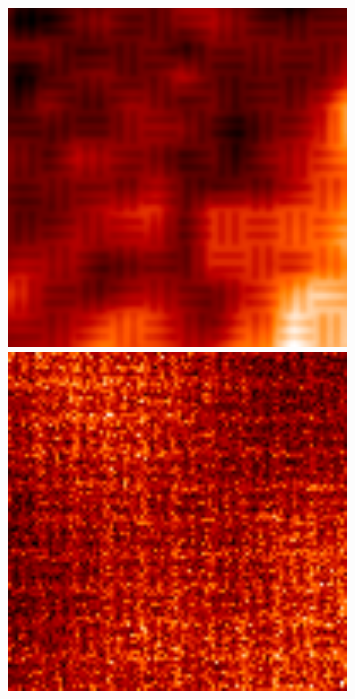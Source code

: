 \documentclass[tocnosub,noragright,centerchapter,12pt]{uiucecethesis09}
\begin{document}
\begin{figure}
  \centering
  \begin{minipage}{.3\textwidth}
    \centering
    \includegraphics[width=0.8\textwidth]{figures/aia_modulate_zoom_blur.png}
  \end{minipage}%
  \begin{minipage}{.3\textwidth}
    \centering
    \includegraphics[width=0.8\textwidth]{figures/aia_modulate_zoom_blur_blur_p.png}
  \end{minipage}
  \begin{minipage}{.3\textwidth}
    \centering

\end{minipage}
\end{figure}
\end{document}
